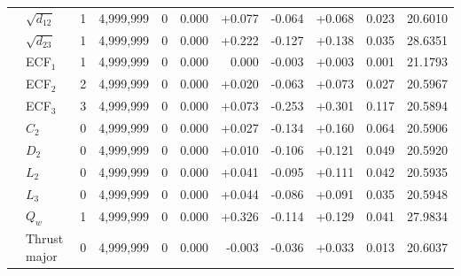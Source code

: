{\begin{longtable}{llrrrrrrrrr}
 & $\sqrt{d_{12}}$ & 1 & 4{,}999{,}999 & 0 & 0.000 & +0.077 & -0.064 & +0.068 & 0.023 & 20.6010 \\
 & $\sqrt{d_{23}}$ & 1 & 4{,}999{,}999 & 0 & 0.000 & +0.222 & -0.127 & +0.138 & 0.035 & 28.6351 \\
 & ECF$_1$ & 1 & 4{,}999{,}999 & 0 & 0.000 & 0.000 & -0.003 & +0.003 & 0.001 & 21.1793 \\
 & ECF$_2$ & 2 & 4{,}999{,}999 & 0 & 0.000 & +0.020 & -0.063 & +0.073 & 0.027 & 20.5967 \\
 & ECF$_3$ & 3 & 4{,}999{,}999 & 0 & 0.000 & +0.073 & -0.253 & +0.301 & 0.117 & 20.5894 \\
 & $C_2$ & 0 & 4{,}999{,}999 & 0 & 0.000 & +0.027 & -0.134 & +0.160 & 0.064 & 20.5906 \\
 & $D_2$ & 0 & 4{,}999{,}999 & 0 & 0.000 & +0.010 & -0.106 & +0.121 & 0.049 & 20.5920 \\
 & $L_2$ & 0 & 4{,}999{,}999 & 0 & 0.000 & +0.041 & -0.095 & +0.111 & 0.042 & 20.5935 \\
 & $L_3$ & 0 & 4{,}999{,}999 & 0 & 0.000 & +0.044 & -0.086 & +0.091 & 0.035 & 20.5948 \\
 & $Q_w$ & 1 & 4{,}999{,}999 & 0 & 0.000 & +0.326 & -0.114 & +0.129 & 0.041 & 27.9834 \\
 & Thrust major & 0 & 4{,}999{,}999 & 0 & 0.000 & -0.003 & -0.036 & +0.033 & 0.013 & 20.6037 \\
\end{longtable}
}
